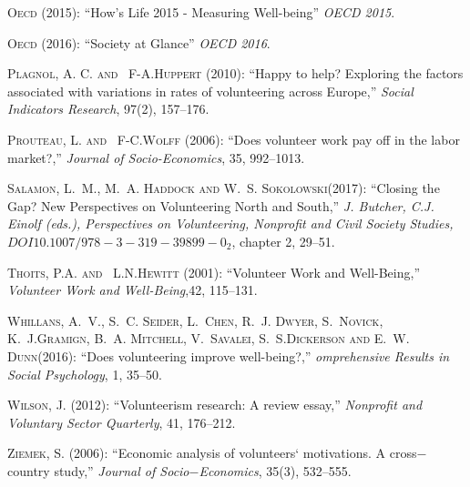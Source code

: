 \documentclass[10pt, letterpaper]{article}
\begin{document}
\begin{spacing}{1.4}
\begin{thebibliography}{87}
\textsc{Oecd} (2015): \enquote{How's Life  2015 - Measuring Well-being} \emph{OECD 2015}.

\textsc{Oecd} (2016): \enquote{Society at Glance} \emph{OECD 2016}.

\textsc{Plagnol, A. C. and ~F-A.Huppert } (2010): \enquote{Happy to help? Exploring the factors associated with variations in rates of volunteering across Europe,} \emph{Social Indicators Research}, 97(2), 157--176.
  
\textsc{Prouteau, L. and ~F-C.Wolff } (2006): \enquote{Does volunteer work pay off in the labor market?,} \emph{Journal of Socio-Economics}, 35, 992--1013.

 \textsc{Salamon, L.~M., M.~A. Haddock and W.~S. Sokolowski}(2017):
 \enquote{Closing the Gap? New Perspectives on Volunteering North and South,} \emph{J. Butcher, C.J. Einolf (eds.), Perspectives on Volunteering, Nonprofit and Civil Society Studies, $DOI 10.1007/978-3-319-39899-0_2$}, chapter 2, 29--51.
  
\textsc{Thoits, P.A. and ~L.N.Hewitt } (2001): \enquote{Volunteer Work and Well-Being,} \emph{Volunteer Work and Well-Being},42, 115--131.


\textsc{Whillans, A.~V., S.~C. Seider, L.~Chen, R.~J. Dwyer, S.~Novick, K.~J.Gramign, B.~A. Mitchell, V.~Savalei, S.~S.Dickerson and E.~W. Dunn}(2016):
  \enquote{Does volunteering improve well-being?,} \emph{omprehensive Results in Social Psychology}, 1, 35--50.

  
\textsc{Wilson, J.} (2012): \enquote{Volunteerism research: A
  review essay,} \emph{Nonprofit and Voluntary Sector Quarterly}, 41, 176--212.

\textsc{Ziemek, S.} (2006): \enquote{Economic analysis of volunteers` motivations. A cross$-$country study,} \emph{Journal of Socio$-$Economics}, 35(3), 532--555.



\end{thebibliography}
\end{spacing}
\end{document}

